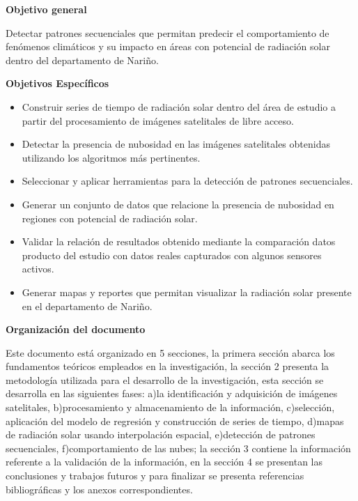 \textbf{Objetivo general}

Detectar patrones secuenciales que permitan predecir el comportamiento de fenómenos climáticos y su impacto en  áreas con potencial 
de radiación solar dentro del departamento de Nariño.


\textbf{Objetivos Específicos}

\begin{itemize}
 \item Construir series de tiempo de radiación solar dentro del área de estudio a partir del procesamiento de imágenes satelitales de libre acceso.
 \item Detectar la presencia de nubosidad en las imágenes satelitales obtenidas utilizando los algoritmos más pertinentes.
 \item Seleccionar y aplicar herramientas para la detección de patrones secuenciales.
 \item Generar un conjunto de datos que relacione la presencia de nubosidad en regiones con potencial de radiación solar.
 \item Validar la relación de resultados obtenido mediante la comparación datos producto  del estudio con datos reales capturados con algunos sensores activos.
 \item Generar mapas y reportes que permitan visualizar la radiación solar presente en el departamento de Nariño.
\end{itemize}


\textbf{Organización del documento}

Este documento está organizado en 5 secciones, la primera sección abarca los fundamentos teóricos empleados en la investigación,
la sección 2 presenta la metodología utilizada para el desarrollo de la investigación, esta sección se desarrolla en las 
siguientes fases: a)la identificación y adquisición de imágenes satelitales, b)procesamiento y almacenamiento de la 
información, c)selección, aplicación del modelo de regresión y construcción de series de tiempo, d)mapas de radiación solar usando 
interpolación espacial, e)detección de patrones secuenciales, f)comportamiento de las nubes; la sección 3 contiene la información 
referente a la validación de la información, en la sección 4 se presentan las conclusiones y trabajos futuros 
y para finalizar se presenta referencias bibliográficas y los anexos correspondientes.